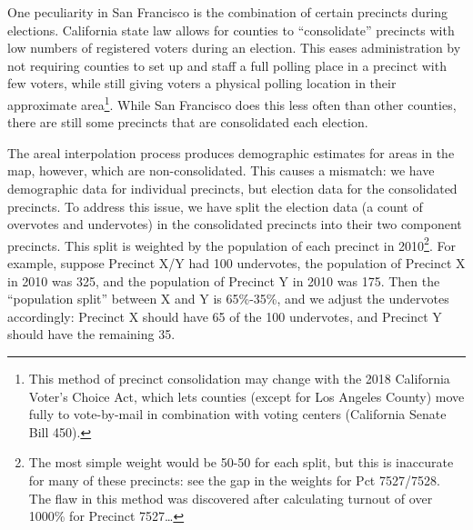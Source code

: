 \documentclass[12pt,twoside]{reedthesis}
\theoremstyle{definition}
\theoremstyle{definition}
\theoremstyle{definition}
\theoremstyle{remark}
\begin{document}
One peculiarity in San Francisco is the combination of certain precincts
during elections. California state law allows for counties to
``consolidate'' precincts with low numbers of registered voters during
an election. This eases administration by not requiring counties to set
up and staff a full polling place in a precinct with few voters, while
still giving voters a physical polling location in their approximate
area\footnote{This method of precinct consolidation may change with the
  2018 California Voter's Choice Act, which lets counties (except for
  Los Angeles County) move fully to vote-by-mail in combination with
  voting centers (California Senate Bill 450).}. While San Francisco
does this less often than other counties, there are still some precincts
that are consolidated each election.

The areal interpolation process produces demographic estimates for areas
in the map, however, which are non-consolidated. This causes a mismatch:
we have demographic data for individual precincts, but election data for
the consolidated precincts. To address this issue, we have split the
election data (a count of overvotes and undervotes) in the consolidated
precincts into their two component precincts. This split is weighted by
the population of each precinct in 2010\footnote{The most simple weight
  would be 50-50 for each split, but this is inaccurate for many of
  these precincts: see the gap in the weights for Pct 7527/7528. The
  flaw in this method was discovered after calculating turnout of over
  1000\% for Precinct 7527\ldots{}}. For example, suppose Precinct X/Y
had 100 undervotes, the population of Precinct X in 2010 was 325, and
the population of Precinct Y in 2010 was 175. Then the ``population
split'' between X and Y is 65\%-35\%, and we adjust the undervotes
accordingly: Precinct X should have 65 of the 100 undervotes, and
Precinct Y should have the remaining 35.
\end{document}
